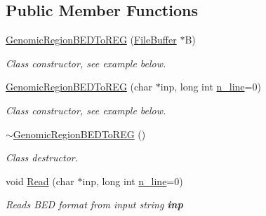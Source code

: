\subsection*{Public Member Functions}
\begin{DoxyCompactItemize}
\item 
\hypertarget{classGenomicRegionBEDToREG_a964b37e08c0c513d974e14cadaba5d20}{
\hyperlink{classGenomicRegionBEDToREG_a964b37e08c0c513d974e14cadaba5d20}{GenomicRegionBEDToREG} (\hyperlink{classFileBuffer}{FileBuffer} $\ast$B)}
\label{classGenomicRegionBEDToREG_a964b37e08c0c513d974e14cadaba5d20}

\begin{DoxyCompactList}\small\item\em Class constructor, see example below. \end{DoxyCompactList}\item 
\hypertarget{classGenomicRegionBEDToREG_ab0fa681e5f8ddc81b0e27786bd86b9d9}{
\hyperlink{classGenomicRegionBEDToREG_ab0fa681e5f8ddc81b0e27786bd86b9d9}{GenomicRegionBEDToREG} (char $\ast$inp, long int \hyperlink{classGenomicRegion_aefe2255aeed5338060190ded05cb9c0c}{n\_\-line}=0)}
\label{classGenomicRegionBEDToREG_ab0fa681e5f8ddc81b0e27786bd86b9d9}

\begin{DoxyCompactList}\small\item\em Class constructor, see example below. \end{DoxyCompactList}\item 
\hypertarget{classGenomicRegionBEDToREG_a59650c4d898e5835271627bf8c45c609}{
\hyperlink{classGenomicRegionBEDToREG_a59650c4d898e5835271627bf8c45c609}{$\sim$GenomicRegionBEDToREG} ()}
\label{classGenomicRegionBEDToREG_a59650c4d898e5835271627bf8c45c609}

\begin{DoxyCompactList}\small\item\em Class destructor. \end{DoxyCompactList}\item 
\hypertarget{classGenomicRegionBEDToREG_a3f18f7f3946f2258b30e9796fafee093}{
void \hyperlink{classGenomicRegionBEDToREG_a3f18f7f3946f2258b30e9796fafee093}{Read} (char $\ast$inp, long int \hyperlink{classGenomicRegion_aefe2255aeed5338060190ded05cb9c0c}{n\_\-line}=0)}
\label{classGenomicRegionBEDToREG_a3f18f7f3946f2258b30e9796fafee093}

\begin{DoxyCompactList}\small\item\em Reads BED format from input string {\bfseries inp} \end{DoxyCompactList}\end{DoxyCompactItemize}


